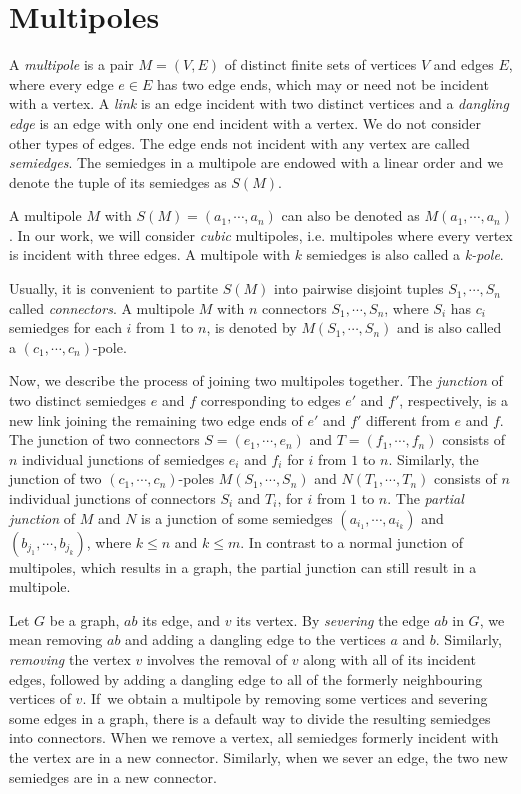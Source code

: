 \section{Multipoles}
\label{sec:multipoles}

A \textit{multipole} is a pair $M=(V,E)$ of distinct finite sets of vertices $V$ and edges $E$, where every edge $e\in E$ has two edge ends, which may or need not be incident with a vertex. A \emph{link} is an edge incident with two distinct vertices and a \emph{dangling edge} is an edge with only one end incident with a vertex. We do not consider other types of edges. The edge ends not incident with any vertex are called \textit{semiedges}. The semiedges in a multipole are endowed with a linear order and we denote the tuple of its semiedges as $S(M)$.

A multipole $M$ with $S(M) = (a_1, \cdots, a_n)$ can also be denoted as $M(a_1,\cdots,a_n)$. In our work, we will consider \textit{cubic} multipoles, i.e. multipoles where every vertex is incident with three edges. 
A multipole with $k$ semiedges is also called a \textit{k-pole}. 

Usually, it is convenient to partite $S(M)$ into pairwise disjoint tuples $S_1,\cdots, S_n$ called \textit{connectors}.
A multipole $M$ with $n$ connectors $S_1,\cdots,S_n$, where $S_i$ has $c_i$ semiedges for each $i$ from $1$ to $n$, is denoted by $M(S_1,\cdots,S_n)$ and is also called a $(c_1,\cdots,c_n)$-pole.

Now, we describe the process of joining two multipoles together.
The \textit{junction} of two distinct semiedges $e$ and $f$ corresponding to edges $e'$ and $f'$, respectively, is a new link joining the remaining two edge ends of $e'$ and $f'$ different from $e$ and $f$.
The junction of two connectors $S=(e_1,\cdots,e_n)$ and $T=(f_1,\cdots,f_n)$ consists of $n$ individual junctions of semiedges $e_i$ and $f_i$ for $i$ from $1$ to $n$.
Similarly, the junction of two $(c_1,\cdots,c_n)$-poles $M(S_1,\cdots,S_n)$ and $N(T_1,\cdots,T_n)$ consists of $n$ individual junctions of connectors $S_i$ and $T_i$, for $i$ from $1$ to $n$.
The \textit{partial junction} of $M$ and $N$ is a junction of some semiedges $(a_{i_1},\cdots, a_{i_k})$ and $(b_{j_1},\cdots, b_{j_k})$, where $k\leq n$ and $k\leq m$. In contrast to a normal junction of multipoles, which results in a graph, the partial junction can still result in a multipole.

Let $G$ be a graph, $ab$ its edge, and $v$ its vertex. By \textit{severing} the edge $ab$ in $G$, we mean removing $ab$ and adding a dangling edge to the vertices $a$ and $b$. Similarly, \textit{removing} the vertex $v$ involves the removal of $v$ along with all of its incident edges, followed by adding a dangling edge to all of the formerly neighbouring vertices of $v$. If~we obtain a multipole by removing some vertices and severing some edges in a graph, there is a default way to divide the resulting semiedges into connectors. When we remove a vertex, all semiedges formerly incident with the vertex are in a new connector. Similarly, when we sever an edge, the two new semiedges are in a new connector.

